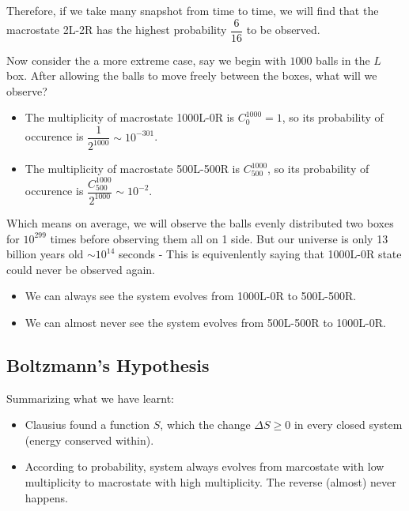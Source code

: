 \documentclass[class=article, crop=false, 12pt]{standalone}
\begin{document}
Therefore, if we take many snapshot from time to time,
we will find that the macrostate 2L-2R has the highest probability $\dfrac{6}{16}$ to be observed.\\


Now consider the a more extreme case, 
say we begin with $1000$ balls in the $L$ box. 
After allowing the balls to move freely between the boxes,
what will we observe? 
\begin{itemize}
    \item The multiplicity of macrostate 1000L-0R is $C^{1000}_0 = 1$, 
        so its probability of occurence is $\dfrac{1}{2^{1000}} \sim 10^{-301}$.

    \item The multiplicity of macrostate 500L-500R is $C^{1000}_{500}$, 
        so its probability of occurence is $\dfrac{C^{1000}_{500}}{2^{1000}} \sim 10^{-2}$.
\end{itemize}

Which means on average,
we will observe the balls evenly distributed two boxes for $10^{299}$ times before observing them all on 1 side.
But our universe is only 13 billion years old $\sim 10^{14}$ seconds - 
This is equivenlently saying that 1000L-0R state could never be observed again.
\begin{itemize}
    \item We can always see the system evolves from 1000L-0R to 500L-500R.
    \item We can almost never see the system evolves from 500L-500R to 1000L-0R.
\end{itemize}

\begin{center}
\end{center}


\subsection{Boltzmann's Hypothesis}

Summarizing what we have learnt:
\begin{itemize}
    \item Clausius found a function $S$, 
    which the change $\Delta S \geq 0$ in every closed system (energy conserved within).

    \item According to probability, 
    system always evolves from marcostate with low multiplicity to macrostate with high multiplicity.
    The reverse (almost) never happens.
\end{itemize}
\end{document}
